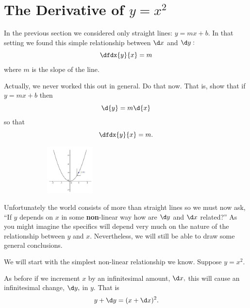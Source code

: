 \section{The Derivative of $y=x^2$}
\label{sec:DerivativeSquare}
In the previous section we considered only straight lines: $y=mx+b.$ In that
setting we found this simple relationship between $\d x$ and $\d y:$
\[\dfdx{y}{x} = m\]
where $m$ is the slope of the line.

\begin{embeddedproblem}{}
  Actually, we never worked this out in general. Do that now. That is,
  show that if $y=mx+b$ then
  $$
  \d{y} = m\d{x}
  $$ 
so that 
$$
\dfdx{y}{x} =m.
$$
\end{embeddedproblem}
\begin{figure}
\captionsetup{labelformat=empty}
\centerline{\includegraphics*[height=1in,width=2in]{Figures/SquareFunction}}
\label{fig:SquareFunction}
\end{figure}
Unfortunately the world consists of more than straight lines so we
must now ask, ``If $y$ depends on $x$ in some {\bf non}-linear way how
are $\d y$ and $\d x$ related?'' As you might imagine the specifics
will depend very much on the nature of the relationship between $y$
and $x.$ Nevertheless, we will still be able to draw some general
conclusions.


We will start with the simplest non-linear relationship we
know. Suppose \(y=x^2.\) 

As  before if we increment $x$
by an infinitesimal amount, $\d x,$ this will cause an infinitesimal
change, $\d y,$ in $y.$ That is 
\[ y+\d y = (x+\d x)^2.\]



